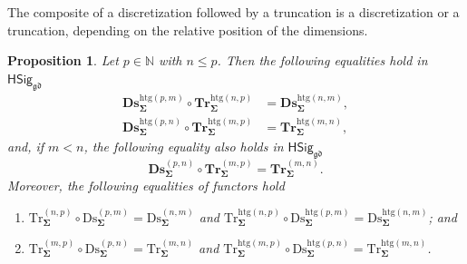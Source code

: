 \documentclass[a4paper, reqno]{amsbook}
\newcommand{\sig}[1]{\mathbf{#1}}             %
\newcommand{\gd}{\mathfrak{gd}}              %
\newcommand{\htg}{\mathrm{htg}}                %
\newcommand{\Ds}{\mathrm{Ds}}
\newcommand{\Tr}{\mathrm{Tr}}
\newcommand{\bDs}{\mathbf{Ds}}
\newcommand{\bTr}{\mathbf{Tr}}
\theoremstyle{plain}
\newtheorem{proposition}[theorem]{Proposition}
\theoremstyle{definition}
\begin{document}
The composite of a discretization followed by a truncation is a discretization or a truncation, depending on the relative position of the dimensions.

\begin{proposition}\label{PTrDsComp}
Let $p\in\mathbb{N}$ with $n\leq p$.
Then the following equalities hold in $\mathsf{HSig}_{\gd}$
\begin{align*}
\bDs^{\htg(p,m)}_{\sig{\Sigma}}\circ\bTr^{\htg(n,p)}_{\sig{\Sigma}}&=\bDs^{\htg(n,m)}_{\sig{\Sigma}},\\
\bDs^{\htg(p,n)}_{\sig{\Sigma}}\circ\bTr^{\htg(m,p)}_{\sig{\Sigma}}&=\bTr^{\htg(m,n)}_{\sig{\Sigma}},
\end{align*}
and, if $m<n$, the following equality also holds in $\mathsf{HSig}_{\gd}$
$$
\bDs^{(p,n)}_{\sig{\Sigma}}\circ\bTr^{(m,p)}_{\sig{\Sigma}}=\bTr^{(m,n)}_{\sig{\Sigma}}.
$$
Moreover, the following equalities of functors hold
\begin{enumerate}
	\item
	$\Tr^{(n,p)}_{\sig{\Sigma}}\circ\Ds^{(p,m)}_{\sig{\Sigma}}=\Ds^{(n,m)}_{\sig{\Sigma}}$ and $\Tr^{\htg(n,p)}_{\sig{\Sigma}}\circ\Ds^{\htg(p,m)}_{\sig{\Sigma}}=\Ds^{\htg(n,m)}_{\sig{\Sigma}}$; and

	\item
	$\Tr^{(m,p)}_{\sig{\Sigma}}\circ\Ds^{(p,n)}_{\sig{\Sigma}}=\Tr^{(m,n)}_{\sig{\Sigma}}$ and $\Tr^{\htg(m,p)}_{\sig{\Sigma}}\circ\Ds^{\htg(p,n)}_{\sig{\Sigma}}=\Tr^{\htg(m,n)}_{\sig{\Sigma}}$.
\end{enumerate}
\end{proposition}
\end{document}
